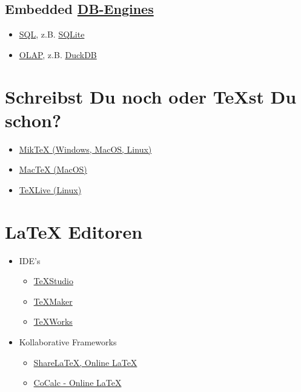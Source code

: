 \documentclass[
  ngerman,
  letterpaper,
]{scrbook}
\providecommand{\tightlist}{%
  \setlength{\itemsep}{0pt}\setlength{\parskip}{0pt}}
\begin{document}
\subsection{\texorpdfstring{Embedded
\href{https://db-engines.com}{DB-Engines}}{Embedded DB-Engines}}\label{embedded-db-engines}

\begin{itemize}
\tightlist
\item
  \href{https://en.wikipedia.org/wiki/SQL}{SQL}, z.B.
  \href{https://en.wikipedia.org/wiki/SQLite}{SQLite}
\item
  \href{https://en.wikipedia.org/wiki/Online_analytical_processing}{OLAP},
  z.B. \href{https://duckdb.org/why_duckdb}{DuckDB}
\end{itemize}

\section{Schreibst Du noch oder TeXst Du
schon?}\label{schreibst-du-noch-oder-texst-du-schon}

\begin{itemize}
\tightlist
\item
  \href{https://miktex.org/}{MikTeX (Windows, MacOS, Linux)}
\item
  \href{https://www.tug.org/mactex/}{MacTeX (MacOS)}
\item
  \href{http://tug.org/texlive/}{TeXLive (Linux)}
\end{itemize}

\section{LaTeX Editoren}\label{latex-editoren}

\begin{itemize}
\tightlist
\item
  IDE's

  \begin{itemize}
  \tightlist
  \item
    \href{http://www.texstudio.org}{TeXStudio}
  \item
    \href{http://www.xm1math.net/texmaker/}{TeXMaker}
  \item
    \href{http://www.tug.org/texworks/}{TeXWorks}
  \end{itemize}
\item
  Kollaborative Frameworks

  \begin{itemize}
  \tightlist
  \item
    \href{https://www.sharelatex.com/}{ShareLaTeX, Online LaTeX}
  \item
    \href{https://cocalc.com/doc/latex-editor.html}{CoCalc - Online
    LaTeX}
  \end{itemize}
\end{itemize}
\end{document}
